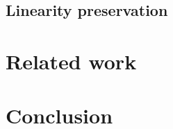 \documentclass{mproj}
\begin{document}
\section{Linearity preservation}\label{linearity-preservation}

\chapter{Related work}\label{related-work}

\chapter{Conclusion}\label{conclusion}



\end{document}
